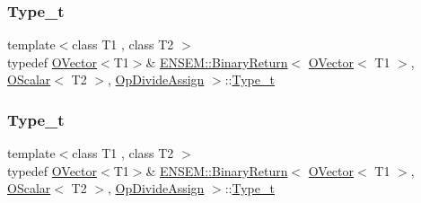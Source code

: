 \subsubsection{\texorpdfstring{Type\_t}{Type\_t}\hspace{0.1cm}{\footnotesize\ttfamily [1/3]}}
{\footnotesize\ttfamily template$<$class T1 , class T2 $>$ \\
typedef \mbox{\hyperlink{classENSEM_1_1OVector}{O\+Vector}}$<$T1$>$\& \mbox{\hyperlink{structENSEM_1_1BinaryReturn}{E\+N\+S\+E\+M\+::\+Binary\+Return}}$<$ \mbox{\hyperlink{classENSEM_1_1OVector}{O\+Vector}}$<$ T1 $>$, \mbox{\hyperlink{classENSEM_1_1OScalar}{O\+Scalar}}$<$ T2 $>$, \mbox{\hyperlink{structENSEM_1_1OpDivideAssign}{Op\+Divide\+Assign}} $>$\+::\mbox{\hyperlink{structENSEM_1_1BinaryReturn_3_01OVector_3_01T1_01_4_00_01OScalar_3_01T2_01_4_00_01OpDivideAssign_01_4_ab2bcb8c826e18a2c69b8d9122e888059}{Type\+\_\+t}}}

\mbox{\label{structENSEM_1_1BinaryReturn_3_01OVector_3_01T1_01_4_00_01OScalar_3_01T2_01_4_00_01OpDivideAssign_01_4_ab2bcb8c826e18a2c69b8d9122e888059}} 
\subsubsection{\texorpdfstring{Type\_t}{Type\_t}\hspace{0.1cm}{\footnotesize\ttfamily [2/3]}}
{\footnotesize\ttfamily template$<$class T1 , class T2 $>$ \\
typedef \mbox{\hyperlink{classENSEM_1_1OVector}{O\+Vector}}$<$T1$>$\& \mbox{\hyperlink{structENSEM_1_1BinaryReturn}{E\+N\+S\+E\+M\+::\+Binary\+Return}}$<$ \mbox{\hyperlink{classENSEM_1_1OVector}{O\+Vector}}$<$ T1 $>$, \mbox{\hyperlink{classENSEM_1_1OScalar}{O\+Scalar}}$<$ T2 $>$, \mbox{\hyperlink{structENSEM_1_1OpDivideAssign}{Op\+Divide\+Assign}} $>$\+::\mbox{\hyperlink{structENSEM_1_1BinaryReturn_3_01OVector_3_01T1_01_4_00_01OScalar_3_01T2_01_4_00_01OpDivideAssign_01_4_ab2bcb8c826e18a2c69b8d9122e888059}{Type\+\_\+t}}}

